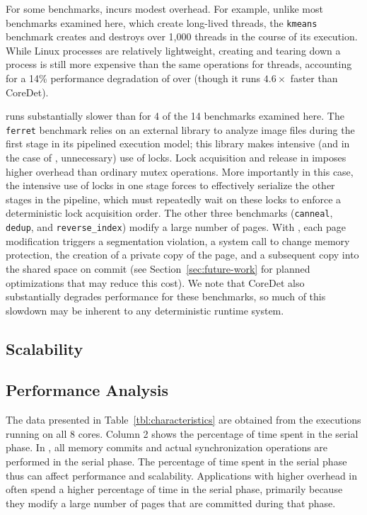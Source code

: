 For some benchmarks, \dthreads{} incurs modest overhead. For example,
unlike most benchmarks examined here, which create long-lived threads,
the
\texttt{kmeans} benchmark creates and destroys over 1,000 threads in the course of its execution. 
While Linux processes are relatively lightweight, creating and tearing
down a process is still more expensive than the same operations for
threads, accounting for a 14\% performance degradation of \dthreads{}
over \pthreads{} (though it runs $4.6\times$ faster than CoreDet).

\dthreads{} runs substantially slower than \pthreads{} for 4 of the 14
benchmarks examined here. The \texttt{ferret} benchmark relies on an
external library to analyze image files during the first stage in its
pipelined execution model; this library makes intensive (and in the
case of \dthreads{}, unnecessary) use of locks. Lock acquisition and
release in \dthreads{} imposes higher overhead than
ordinary \pthreads{} mutex operations. More importantly in this case,
the intensive use of locks in one stage forces \dthreads{} to
effectively serialize the other stages in the pipeline, which must
repeatedly wait on these locks to enforce a deterministic lock
acquisition order. The other three benchmarks
(\texttt{canneal}, \texttt{dedup}, and \texttt{reverse\_index}) modify
a large number of pages. With \dthreads{}, each page modification
triggers a segmentation violation, a system call to change memory
protection, the creation of a private copy of the page, and a
subsequent copy into the shared space on commit (see
Section~\ref{sec:future-work} for planned optimizations that may
reduce this cost). We note that CoreDet also substantially degrades
performance for these benchmarks, so much of this slowdown may be
inherent to any deterministic runtime system.

\subsection{Scalability}



\subsection{Performance Analysis}

The data presented in Table~\ref{tbl:characteristics} are obtained
from the executions running on all 8 cores.  Column 2 shows the
percentage of time spent in the serial phase.  In \dthreads{}, all
memory commits and actual synchronization operations are performed in
the serial phase.  The percentage of time spent in the serial phase
thus can affect performance and scalability. Applications with higher
overhead in \dthreads{} often spend a higher percentage of time in the
serial phase, primarily because they modify a large number of pages
that are committed during that phase.


